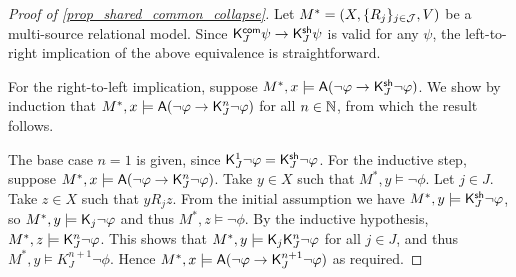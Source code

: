 \begin{proof}[Proof of \cref{prop_shared_common_collapse}]

Let $M^* = (X, \{R_j\}_{j \in \mathcal{J}}, V)$ be a multi-source relational
model. Since $\mathsf{K}^{\mathsf{com}}_J\psi \to \mathsf{K}^{\mathsf{sh}}_J\psi$ is valid for
any $\psi$, the left-to-right implication of the above equivalence
is straightforward.

For the right-to-left implication, suppose $M^*, x \models
\mathsf{A}(\neg\varphi \to \mathsf{K}^{\mathsf{sh}}_J\neg\varphi)$. We show by induction that
$M^*, x \models \mathsf{A}(\neg\varphi \to \mathsf{K}_J^n\neg\varphi)$ for all
$n \in \mathbb{N}$, from which the result follows.

The base case $n = 1$ is given, since $\mathsf{K}_J^1\neg\varphi =
\mathsf{K}^{\mathsf{sh}}_J\neg\varphi$. For the inductive step, suppose $M^*, x
\models \mathsf{A}(\neg\varphi \to \mathsf{K}_J^n\neg\varphi)$. Take $y \in X$ such
that $M^*, y \models \neg\phi$. Let $j \in J$. Take $z
\in X$ such that $y{R_j}z$. From the initial assumption we have
$M^*, y \models \mathsf{K}^{\mathsf{sh}}_J\neg\varphi$, so $M^*, y \models
\mathsf{K}_j\neg\varphi$ and thus $M^*, z \models \neg\phi$. By the inductive
hypothesis, $M^*, z \models \mathsf{K}_J^n\neg\varphi$. This shows that
$M^*, y \models \mathsf{K}_j\mathsf{K}_J^n\neg\varphi$ for all $j \in J$, and
thus $M^*, y \models K^{n+1}_J\neg\phi$. Hence $M^*, x
\models \mathsf{A}(\neg\varphi \to \mathsf{K}^{n+1}_J\neg\varphi)$ as required.

\end{proof}




